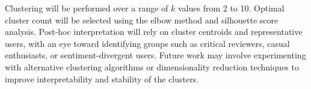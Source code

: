 Clustering will be performed over a range of \( k \) values from 2 to 10. Optimal cluster count will be selected using the elbow method and silhouette score analysis. Post-hoc interpretation will rely on cluster centroids and representative users, with an eye toward identifying groups such as critical reviewers, casual enthusiasts, or sentiment-divergent users. Future work may involve experimenting with alternative clustering algorithms or dimensionality reduction techniques to improve interpretability and stability of the clusters.
